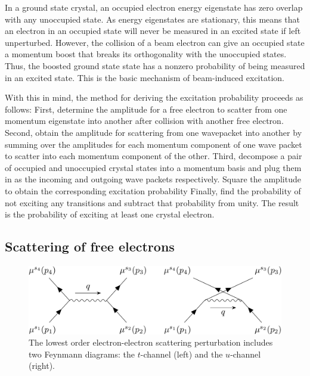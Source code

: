 \documentclass{article}
\begin{document}
In a ground state crystal, an occupied electron energy eigenstate has zero overlap with any unoccupied state.  As energy eigenstates are stationary, this means that an electron in an occupied state will never be measured in an excited state if left unperturbed.  However, the collision of a beam electron can give an occupied state a momentum boost that breaks its orthogonality with the unoccupied states.  Thus, the boosted ground state state has a nonzero probability of being measured in an excited state.  This is the basic mechanism of beam-induced excitation.

With this in mind, the method for deriving the excitation probability proceeds as follows:
First,
determine the amplitude for a free electron to scatter from one momentum eigenstate into another after collision with another free electron.
Second,
obtain the amplitude for scattering from one wavepacket into another by summing over the amplitudes for each momentum component of one wave packet to scatter into each momentum component of the other.
Third,
decompose a pair of occupied and unoccupied crystal states into a momentum basis and plug them in as the incoming and outgoing wave packets respectively.  Square the amplitude to obtain the corresponding excitation probability
Finally,
find the probability of not exciting any transitions and subtract that probability from unity.  The result is the probability of exciting at least one crystal electron.

\subsection{Scattering of free electrons}
\label{sec:ee}

\begin{figure}
    \centering
    \includegraphics[width=.8\textwidth]{images/tu.png}
    \caption{
    The lowest order electron-electron scattering perturbation includes two Feynmann diagrams: the $t$-channel (left) and the $u$-channel (right).
    }
    \label{fig:tu}
\end{figure}
\end{document}
